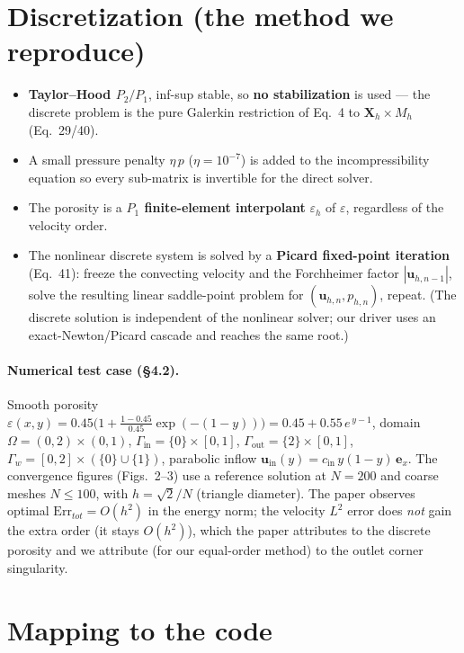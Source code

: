 \documentclass[11pt]{article}
\newcommand{\uu}{\bm{u}}
\begin{document}
\section{Discretization (the method we reproduce)}

\begin{itemize}
\item \textbf{Taylor--Hood $P_2/P_1$}, inf-sup stable, so \textbf{no stabilization} is used --- the
discrete problem is the pure Galerkin restriction of Eq.~4 to $\bm X_h\times M_h$ (Eq.~29/40).
\item A small pressure penalty $\eta\,p$ ($\eta=10^{-7}$) is added to the incompressibility equation so
every sub-matrix is invertible for the direct solver.
\item The porosity is a \textbf{$P_1$ finite-element interpolant} $\varepsilon_h$ of $\varepsilon$,
regardless of the velocity order.
\item The nonlinear discrete system is solved by a \textbf{Picard fixed-point iteration} (Eq.~41):
freeze the convecting velocity and the Forchheimer factor $|\uu_{h,n-1}|$, solve the resulting linear
saddle-point problem for $(\uu_{h,n},p_{h,n})$, repeat. (The discrete solution is independent of the
nonlinear solver; our driver uses an exact-Newton/Picard cascade and reaches the same root.)
\end{itemize}

\paragraph{Numerical test case (\S4.2).} Smooth porosity
$\varepsilon(x,y)=0.45\big(1+\tfrac{1-0.45}{0.45}\exp(-(1-y))\big)=0.45+0.55\,e^{\,y-1}$,
domain $\Omega=(0,2)\times(0,1)$, $\Gamma_{\mathrm{in}}=\{0\}\times[0,1]$,
$\Gamma_{\mathrm{out}}=\{2\}\times[0,1]$, $\Gamma_w=[0,2]\times(\{0\}\cup\{1\})$, parabolic inflow
$\uu_{\mathrm{in}}(y)=c_{\mathrm{in}}\,y(1-y)\,\bm e_x$. The convergence figures (Figs.~2--3) use a
reference solution at $N=200$ and coarse meshes $N\le100$, with $h=\sqrt2/N$ (triangle diameter).
The paper observes optimal $\mathrm{Err}_{tot}=O(h^2)$ in the energy norm; the velocity $L^2$ error does
\emph{not} gain the extra order (it stays $O(h^2)$), which the paper attributes to the discrete
porosity and we attribute (for our equal-order method) to the outlet corner singularity.

\section{Mapping to the code}
\end{document}
